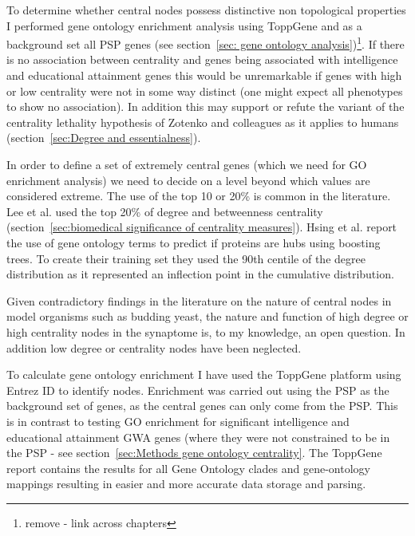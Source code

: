 To determine whether central nodes possess distinctive non topological properties I performed gene ontology enrichment analysis using ToppGene and as a background set all PSP genes (see section~\ref{sec: gene ontology analysis})\footnote{remove - link across chapters}. If there is no association between centrality and genes being associated with intelligence and educational attainment genes this would be unremarkable if genes with high or low centrality were not in some way distinct (one might expect all phenotypes to show no association). In addition  this may support or refute the variant of the centrality lethality hypothesis of Zotenko and colleagues \cite{zotenko2008hubs} as it applies to humans (section~\ref{sec:Degree and essentialness}).

In order to define a set of extremely central genes (which we need for GO enrichment analysis) we need to decide on a level beyond which values are considered extreme. The use of the top 10 or 20\% is common in the literature.  Lee et al.\cite{lee2013network} used the top 20\% of degree and betweenness centrality (section~\ref{sec:biomedical significance of centrality measures}).  Hsing et al.\cite{hsing2008use} report the use of gene ontology terms to predict if proteins are hubs using boosting trees. To create their training set they used the 90th centile of the degree distribution as it represented an inflection point in the cumulative distribution.


Given contradictory findings in the literature on the nature of central nodes in model organisms such as budding yeast, the nature and function of high degree or high centrality nodes in the synaptome is, to my knowledge, an open question. In addition low degree or centrality nodes have been neglected.






To calculate gene ontology enrichment I have used the ToppGene platform\cite{chen2009toppgene} using Entrez ID to identify nodes. Enrichment was carried out using the PSP as the background set of genes, as the central genes can only come from the PSP. This is in contrast to testing GO enrichment for significant intelligence and educational attainment GWA genes (where they were not constrained to be in the PSP - see section~\ref{sec:Methods gene ontology centrality}. The ToppGene report contains the results for all Gene Ontology clades and gene-ontology mappings resulting in easier and more accurate data storage and parsing. 

